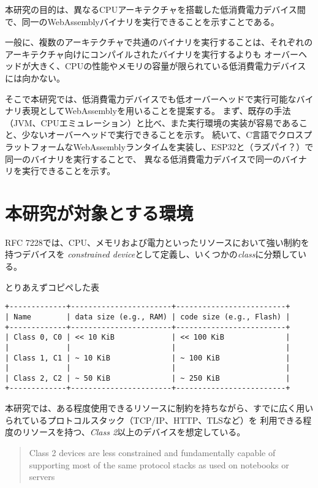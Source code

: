 本研究の目的は、異なるCPUアーキテクチャを搭載した低消費電力デバイス間で、同一のWebAssemblyバイナリを実行できることを示すことである。

一般に、複数のアーキテクチャで共通のバイナリを実行することは、それぞれのアーキテクチャ向けにコンパイルされたバイナリを実行するよりも
オーバーヘッドが大きく、CPUの性能やメモリの容量が限られている低消費電力デバイスには向かない。

そこで本研究では、低消費電力デバイスでも低オーバーヘッドで実行可能なバイナリ表現としてWebAssemblyを用いることを提案する。
まず、既存の手法（JVM、CPUエミュレーション）と比べ、また実行環境の実装が容易であること、少ないオーバーヘッドで実行できることを示す。
続いて、C言語でクロスプラットフォームなWebAssemblyランタイムを実装し、ESP32と（ラズパイ？）で同一のバイナリを実行することで、
異なる低消費電力デバイスで同一のバイナリを実行できることを示す。

\section{本研究が対象とする環境}

RFC 7228\cite{rfc7228}では、CPU、メモリおよび電力といったリソースにおいて強い制約を持つデバイスを
{\it constrained device}として定義し、いくつかの{\it class}に分類している。

\begin{itembox}[l]{とりあえずコピペした表}
\begin{verbatim}
+-------------+-----------------------+-------------------------+
| Name        | data size (e.g., RAM) | code size (e.g., Flash) |
+-------------+-----------------------+-------------------------+
| Class 0, C0 | << 10 KiB             | << 100 KiB              |
|             |                       |                         |
| Class 1, C1 | ~ 10 KiB              | ~ 100 KiB               |
|             |                       |                         |
| Class 2, C2 | ~ 50 KiB              | ~ 250 KiB               |
+-------------+-----------------------+-------------------------+
\end{verbatim}
\end{itembox}

本研究では、ある程度使用できるリソースに制約を持ちながら、すでに広く用いられているプロトコルスタック（TCP/IP、HTTP、TLSなど）を
利用できる程度のリソースを持つ、{\it Class 2}以上のデバイスを想定している。

\begin{quote}
  Class 2 devices are less constrained and fundamentally capable of
  supporting most of the same protocol stacks as used on notebooks or
  servers
\end{quote}


